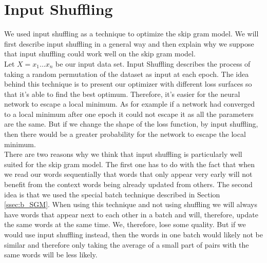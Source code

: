 \section{Input Shuffling}
We used input shuffling as a technique to optimize the skip gram model. We will first describe input shuffling in a general way and then explain why we suppose that input shuffling could work well on the skip gram model. \\
Let $X = {x_1...x_n}$ be our input data set. Input Shuffling describes the process of taking a random permutation of the dataset as input at each epoch.
The idea behind this technique is to present our optimizer with different loss surfaces so that it's able to find the best optimum. Therefore, it's easier for the neural network to escape a local minimum. As for example if a network had converged to a local minimum after one epoch it could not escape it as all the parameters are the same. But if we change the shape of the loss function, by input shuffling, then there would be a greater probability for the network to escape the local minimum.
\\
There are two reasons why we think that input shuffling is particularly well suited for the skip gram model. The first one has to do with the fact that when we read our words sequentially that words that only appear very early will not benefit from the context words being already updated from others. The second idea is that we used the special batch technique described in Section \ref{ssec:b_SGM}. When using this technique and not using shuffling we will always have words that appear next to each other in a batch and will, therefore, update the same words at the same time. We, therefore, lose some quality. But if we would use input shuffling instead, then the words in one batch would likely not be similar and therefore only taking the average of a small part of pairs with the same words will be less likely.

